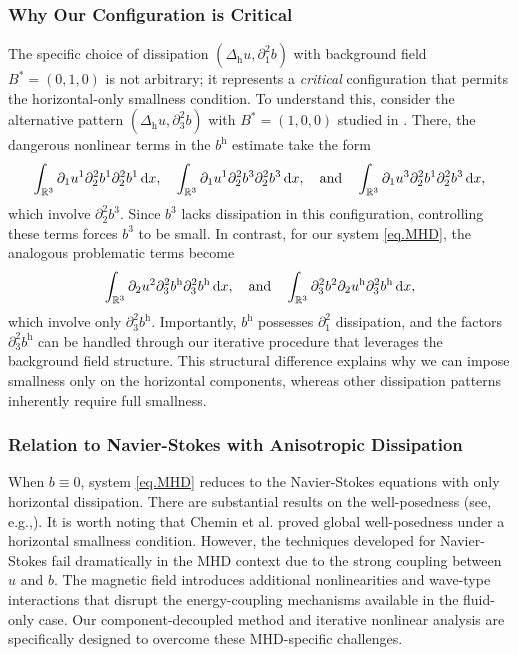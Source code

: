 \documentclass[11pt]{amsart}
\theoremstyle{definition}
\newcommand{\R}{\mathbb{R}}
\newcommand{\h}{\mathrm{h}}
\newcommand{\dx}{\,{\rm d}x}
\numberwithin{equation}{section}
\begin{document}
\subsubsection{Why Our Configuration is Critical}
The specific choice of dissipation $(\Delta_\mathrm{h}u,\partial_1^2b)$ with background field $B^*=(0,1,0)$ is not arbitrary; it represents a \emph{critical} configuration that permits the horizontal-only smallness condition. To understand this, consider the alternative pattern $(\Delta_\mathrm{h}u,\partial_3^2b)$ with $B^*=(1,0,0)$ studied in \cite{21wu}. There, the dangerous nonlinear terms in the $b^\mathrm{h}$ estimate take the form
\begin{align*}
	\int_{\R^3}\partial_1u^1\partial_2^2b^1\partial_2^2b^1\dx,\quad \int_{\R^3}\partial_1u^1\partial_2^2b^3\partial_2^2b^3\dx, \quad\mathrm{and}\quad\int_{\R^3}\partial_1u^3\partial_2^2b^1\partial_2^2b^3\dx,
\end{align*}
which involve $\partial_2^2 b^3$. Since $b^3$ lacks dissipation in this configuration, controlling these terms forces $b^3$ to be small. In contrast, for our system \eqref{eq.MHD}, the analogous problematic terms become
\begin{align*}
	\int_{\R^3}\partial_{2}u^{2} \partial_{3}^2b^\h\partial_{3}^2b^\h\dx,\quad\mathrm{and}\quad\int_{\R^3}\partial_{3}^2b^2\partial_2u^\h\partial_{3}^2b^\h \dx,
\end{align*}
which involve only $\partial_3^2 b^\mathrm{h}$. Importantly, $b^\mathrm{h}$ possesses $\partial_1^2$ dissipation, and the factors $\partial_3^2 b^\mathrm{h}$ can be handled through our iterative procedure that leverages the background field structure. This structural difference explains why we can impose smallness only on the horizontal components, whereas other dissipation patterns inherently require full smallness.

\subsubsection{Relation to Navier-Stokes with Anisotropic Dissipation}
When $b\equiv 0$, system \eqref{eq.MHD} reduces to the Navier-Stokes equations with only horizontal dissipation. There are substantial results on the well-posedness (see,  e.g.,\cite{00chemin,02if,20Liu,05paicu,11paicu,10zhang}). It is worth noting that Chemin et al. \cite{07chemin} proved global well-posedness under a horizontal smallness condition. However, the techniques developed for Navier-Stokes fail dramatically in the MHD context due to the strong coupling between $u$ and $b$. The magnetic field introduces additional nonlinearities and wave-type interactions that disrupt the energy-coupling mechanisms available in the fluid-only case. Our component-decoupled method and iterative nonlinear analysis are specifically designed to overcome these MHD-specific challenges.
\end{document}
